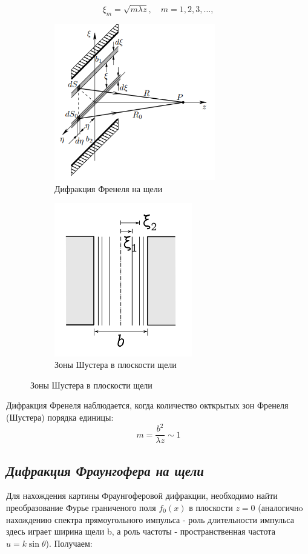 \begin{equation}
\xi_m = \sqrt{m\lambda z}, \quad m = 1, 2, 3, \ldots, \label{eq:xi_m}
\end{equation}
\begin{figure}[h!]
    \centering
    \begin{subfigure}{0.48\linewidth}
        \centering
        \includegraphics[width=7cm]{images/A_theory.png}
        \caption{Дифракция Френеля на щели}
    \end{subfigure}
    \hfill
    \begin{subfigure}{0.5\linewidth}
        \centering
        \includegraphics[width=6cm]{images/shuster_zones.png}
        \caption{Зоны Шустера в плоскости щели}
    \end{subfigure}
\end{figure}

\indent Дифракция Френеля наблюдается, когда количество окткрытых зон Френеля (Шустера) порядка единицы:
\begin{equation}
    m = \frac{b^2}{\lambda z} \sim 1
\end{equation}

\subsection*{\textit{Дифракция Фраунгофера на щели}}
Для нахождения картины Фраунгоферовой дифракции, необходимо найти преобразование Фурье граниченого поля $f_0(x)$ в плоскости $z = 0$ (аналогичнo нахождению спектра прямоугольного импульса - роль длительности импульса здесь
играет ширина щели b, а роль частоты - пространственная частота $u = k \sin\theta$). Получаем:

